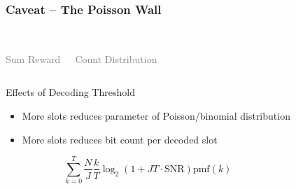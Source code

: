 \documentclass[10pt]{beamer}
\begin{document}
\begin{frame}
\frametitle{Caveat -- The Poisson Wall}

\begin{columns}
  \begin{center}
  \scalebox{1.0}{} \\
  \textcolor{gray}{\scriptsize Sum Reward}
  \end{center}
  \begin{center}
  \scalebox{1.0}{} \\
  \textcolor{gray}{\scriptsize Count Distribution}
\end{center}
\end{columns}
\vfill
\begin{columns}
\begin{block}{Effects of Decoding Threshold}
  \begin{itemize}
  \item More slots reduces parameter of Poisson/binomial distribution
  \item More slots reduces bit count per decoded slot
  \end{itemize}
  \begin{footnotesize}
  \begin{equation*}
  \textstyle \sum_{k=0}^T
  \frac{N}{J} \frac{k}{T} \log_2 \left( 1 + J T \cdot \mathrm{SNR} \right)
  \mathrm{pmf}(k)
  \end{equation*}
  \end{footnotesize}
\end{block}
  \centerline{}
\end{columns}
\end{frame}
\end{document}
